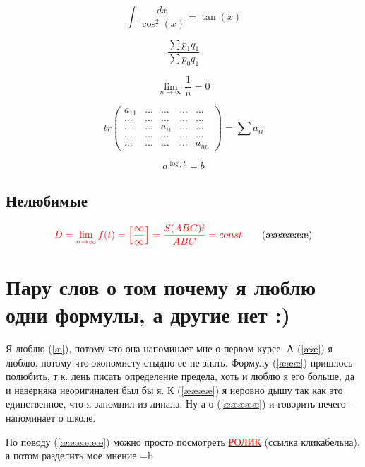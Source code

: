 \documentclass[12pt, a4paper]{article}
\begin{document}
\begin{equation}\label{æ} 
\int\frac{dx}{{\cos}^2(x)}= \tan(x)
\tag{æ}
\end{equation}

\begin{equation}\label{ææ} 
\frac{\sum p_{1}q_{1}}{\sum p_{0}q_{1}}
\tag{ææ}
\end{equation}

\begin{equation}\label{æææ} 
\lim_{n \to \infty}\frac{1}{n}=0
\tag{æææ}
\end{equation}

\begin{equation}\label{ææææ} 
tr \begin{pmatrix} 

a_{11} & ... & ... & ... & ... \\ 
     ...   &...  & ... & ... & ... \\ 
 ... & ... & a_{ii}  & ... & ... \\ 
    ...    & ... & ... & ... & ...\\ 
       ...    & ... & ... & ... & a_{nn} 
\end{pmatrix}
= \sum a_{ii}
\tag{ææææ}
\end{equation}

\begin{equation}\label{æææææ} 
a^{\log_{a}b}=b
\tag{æææææ}
\end{equation}

\subsection{Нелюбимые}

\begin{equation}\label{ææææææ} 
\textcolor{red}{D=\lim_{n \to \infty} f(t)=\left [ \frac{\infty}{\infty} \right ]=\frac{S(ABC)i}{ABC}=const}
\tag{ææææææ}
\end{equation}

\newpage
\section{Пару слов о том почему я люблю одни формулы, а другие нет :) }

Я люблю (\ref{æ}), потому что она напоминает мне о первом курсе. А (\ref{ææ}) я люблю, потому что экономисту стыдно ее не знать. Формулу (\ref{æææ}) пришлось полюбить, т.к. лень писать определение предела, хоть и люблю я его больше, да и наверняка неоригинален был бы я. К (\ref{ææææ}) я неровно дышу так как это единственное, что я запомнил из линала. Ну а о (\ref{æææææ}) и говорить нечего – напоминает о школе.

По поводу (\ref{ææææææ}) можно просто посмотреть \href{https://www.youtube.com/watch?v=NrDe9O2odbw}{\textcolor{red}{РОЛИК}} (ссылка кликабельна), а потом разделить мое мнение =b 
\end{document}

